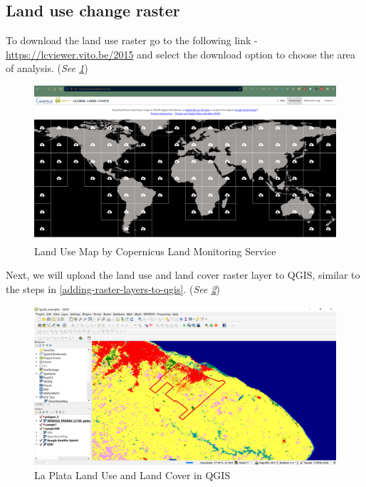 \documentclass[
]{book}
\begin{document}
\hypertarget{land-use-change-raster}{%
\subsection{Land use change raster}\label{land-use-change-raster}}

To download the land use raster go to the following link - \url{https://lcviewer.vito.be/2015} and select the download option to choose the area of analysis. (\emph{See \ref{fig:img-213}})

\begin{figure}

{\centering \includegraphics[width=1\linewidth]{images/lulc} 

}

\caption{Land Use Map by Copernicus Land Monitoring Service}\label{fig:img-213}
\end{figure}

Next, we will upload the land use and land cover raster layer to QGIS, similar to the steps in \ref{adding-raster-layers-to-qgis}. (\emph{See \ref{fig:img-214}})

\begin{figure}

{\centering \includegraphics[width=1\linewidth]{images/lulcla} 

}

\caption{La Plata Land Use and Land Cover in QGIS}\label{fig:img-214}
\end{figure}
\end{document}
